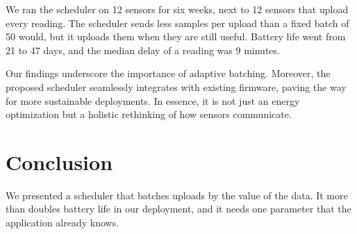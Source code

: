 \documentclass{article}
\begin{document}
We ran the scheduler on 12 sensors for six weeks, next to 12 sensors that
upload every reading. The scheduler sends less samples per upload than a
fixed batch of 50 would, but it uploads them when they are still useful.
Battery life went from 21 to 47 days, and the median delay of a reading was
9 minutes.

Our findings underscore the importance of adaptive batching. Moreover, the
proposed scheduler seamlessly integrates with existing firmware, paving the
way for more sustainable deployments. In essence, it is not just an energy
optimization but a holistic rethinking of how sensors communicate.

\section{Conclusion}

We presented a scheduler that batches uploads by the value of the data. It
more than doubles battery life in our deployment, and it needs one parameter
that the application already knows.
\end{document}
